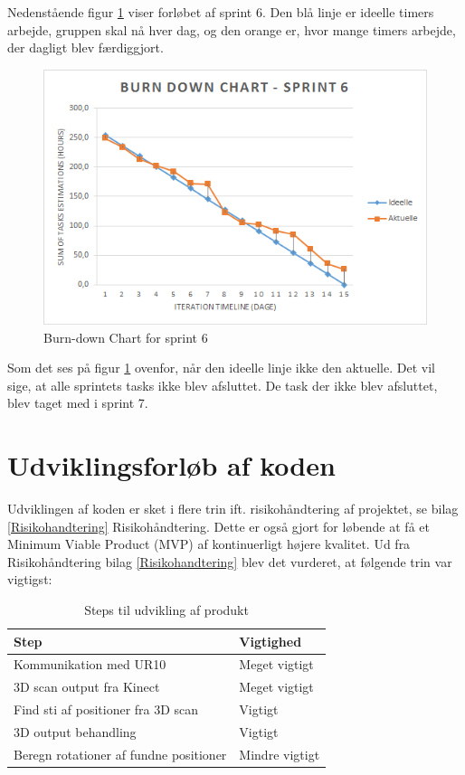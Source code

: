 Nedenstående figur \ref{Burn} viser forløbet af sprint 6. Den blå linje er ideelle timers arbejde, gruppen skal nå hver dag, og den orange er, hvor mange timers arbejde, der dagligt blev færdiggjort. 

\begin{figure}[H]
    \centering
    \includegraphics[width=1\textwidth]{figurer/d/Burn-down}
    \caption{Burn-down Chart for sprint 6}
    \label{Burn}
\end{figure}

Som det ses på figur \ref{Burn} ovenfor, når den ideelle linje ikke den aktuelle. Det vil sige, at alle sprintets tasks ikke blev afsluttet. De task der ikke blev afsluttet, blev taget med i sprint 7. 

\newpage

\section{Udviklingsforløb af koden}
Udviklingen af koden er sket i flere trin ift. risikohåndtering af projektet, se bilag \ref{Risikohandtering} Risikohåndtering. Dette er også gjort for løbende at få et Minimum Viable Product (MVP) af kontinuerligt højere kvalitet. 
Ud fra Risikohåndtering bilag \ref{Risikohandtering} blev det vurderet, at følgende trin var vigtigst:

\begin{table}[h]
\centering
\begin{tabular}{|l| p{}|}
\hline
\textbf{Step} &  \textbf{Vigtighed} \\\hline
	Kommunikation med UR10 & Meget vigtigt \\\hline
	3D scan output fra Kinect & Meget vigtigt\\\hline
	Find sti af positioner fra 3D scan & Vigtigt \\\hline
	3D output behandling & Vigtigt \\\hline
	Beregn rotationer af fundne positioner & Mindre vigtigt \\\hline
\end{tabular}
\caption{Steps til udvikling af produkt}
\end{table}

